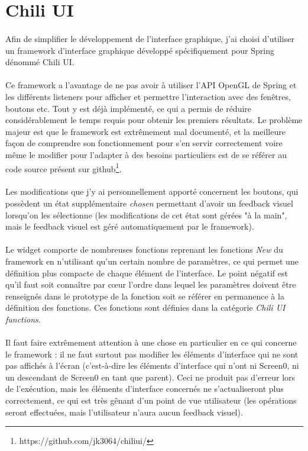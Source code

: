 \documentclass[a4paper]{article}
\begin{document}
\section{Chili UI}
\paragraph{}
Afin de simplifier le développement de l'interface graphique, j'ai choisi d'utiliser un framework d'interface graphique développé spécifiquement pour Spring dénommé Chili UI. 
\paragraph{}
Ce framework a l'avantage de ne pas avoir à utiliser l'API OpenGL de Spring et les différents listeners pour afficher et permettre l'interaction avec des fenêtres, boutons etc. Tout y est déjà implémenté, ce qui a permis de réduire considérablement le temps requis pour obtenir les premiers résultats. Le problème majeur est que le framework est extrêmement mal documenté, et la meilleure façon de comprendre son fonctionnement pour s'en servir correctement voire même le modifier pour l'adapter à des besoins particuliers est de se référer au code source présent sur github\footnote{https://github.com/jk3064/chiliui/}.
\paragraph{}
Les modifications que j'y ai personnellement apporté concernent les boutons, qui possèdent un état supplémentaire \textit{chosen} permettant d'avoir un feedback visuel lorsqu'on les sélectionne (les modifications de cet état sont gérées "à la main", mais le feedback visuel est géré automatiquement par le framework).
\paragraph{}
Le widget comporte de nombreuses fonctions reprenant les fonctions \textit{New} du framework en n'utilisant qu'un certain nombre de paramètres, ce qui permet une définition plus compacte de chaque élément de l'interface. Le point négatif est qu'il faut soit connaître par cœur l'ordre dans lequel les paramètres doivent être renseignés dans le prototype de la fonction soit se référer en permanence à la définition des fonctions. Ces fonctions sont définies dans la catégorie \textit{Chili UI functions}.
\paragraph{}
Il faut faire extrêmement attention à une chose en particulier en ce qui concerne le framework : il ne faut surtout pas modifier les éléments d'interface qui ne sont pas affichés à l'écran (c'est-à-dire les éléments d'interface qui n'ont ni Screen0, ni un descendant de Screen0 en tant que parent). Ceci ne produit pas d'erreur lors de l'exécution, mais les éléments d'interface concernés ne s'actualiseront plus correctement, ce qui est très gênant d'un point de vue utilisateur (les opérations seront effectuées, mais l'utilisateur n'aura aucun feedback visuel).
\end{document}
